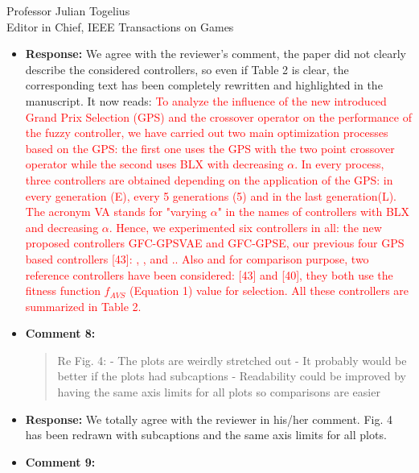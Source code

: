 \documentclass[10pt]{letter} %
\begin{document}
\begin{letter}{Professor Julian Togelius \\ Editor in Chief, IEEE Transactions on Games}
\begin{enumerate}
\begin{itemize}
\begin{quote}
					I still have some issues with the experimental evaluation:
					- It would help if you could make clearer what abbreviation you are using for which controller. "VA", e.g. was never mentioned as an abbreviation for the crossover. On page 6, line 40, you also mention GVC-VA twice. Table 2 helps a lot, but the text on its own is not entirely clear.
				\end{quote}	
			\item {\bf Response:} 
			We agree with the reviewer's comment, the paper did not clearly describe the considered controllers, so even if Table 2 is clear, the corresponding text has been completely rewritten and highlighted in the manuscript. It now reads:
			\textcolor{red}{
				To analyze the influence of the new introduced Grand Prix Selection (GPS) and the crossover operator on the performance of the fuzzy controller, we have carried out two main optimization processes based on the GPS: the first one uses the GPS with the two point crossover operator while the second uses  BLX with decreasing $\alpha$.
				In every process, three controllers are obtained depending on the application of the GPS: in every generation (E), every 5 generations (5) and in the last generation(L). The acronym VA  stands for "varying $\alpha$" in the names of  controllers with BLX and decreasing $\alpha$.
				Hence, we experimented six controllers in all: the new
				proposed controllers {\sf GFC-GPSVAE} and {\sf GFC-GPSE}, our previous four GPS based controllers  [43]: {}, {},{} and {}..
				Also and for comparison purpose, two reference controllers have been considered: {}[43] and {}[40], they both use the fitness function $f_{AVS}$ (Equation 1) value for selection.
				All these controllers are summarized in Table 2. 
			}
			\item {\bf Comment 8:}
				\begin{quote}	
					Re Fig. 4:
					- The plots are weirdly stretched out
					- It probably would be better if the plots had subcaptions
					- Readability could be improved by having the same axis limits for all plots so comparisons are easier
				\end{quote}	
			\item {\bf Response:} 
				We totally agree with the reviewer in his/her comment. Fig. 4 has been redrawn with subcaptions and the same axis limits for all plots.
			\item {\bf Comment 9:}
				\begin{quote}	

\end{quote}
\end{itemize}
\end{enumerate}
\end{letter}
\end{document}
